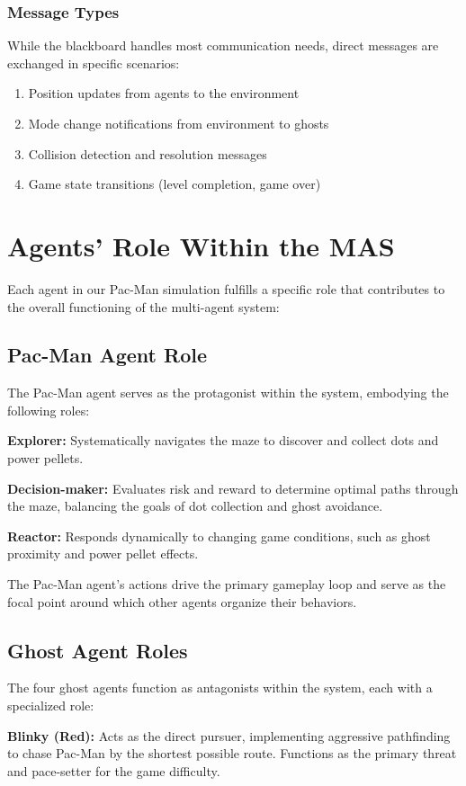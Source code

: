 \documentclass[a4paper, 11pt]{article}
\begin{document}
\subsubsection{Message Types}
While the blackboard handles most communication needs, direct messages are exchanged in specific scenarios:
\begin{enumerate}
    \item Position updates from agents to the environment
    \item Mode change notifications from environment to ghosts
    \item Collision detection and resolution messages
    \item Game state transitions (level completion, game over)
\end{enumerate}

\section{Agents' Role Within the MAS}

Each agent in our Pac-Man simulation fulfills a specific role that contributes to the overall functioning of the multi-agent system:

\subsection{Pac-Man Agent Role}
The Pac-Man agent serves as the protagonist within the system, embodying the following roles:

\textbf{Explorer:} Systematically navigates the maze to discover and collect dots and power pellets.

\textbf{Decision-maker:} Evaluates risk and reward to determine optimal paths through the maze, balancing the goals of dot collection and ghost avoidance.

\textbf{Reactor:} Responds dynamically to changing game conditions, such as ghost proximity and power pellet effects.

The Pac-Man agent's actions drive the primary gameplay loop and serve as the focal point around which other agents organize their behaviors.

\subsection{Ghost Agent Roles}
The four ghost agents function as antagonists within the system, each with a specialized role:

\textbf{Blinky (Red):} Acts as the direct pursuer, implementing aggressive pathfinding to chase Pac-Man by the shortest possible route. Functions as the primary threat and pace-setter for the game difficulty.
\end{document}
